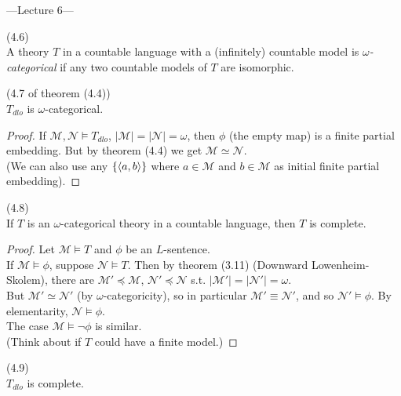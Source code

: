 \documentclass[a4paper]{article}
\begin{document}
---Lecture 6---

\begin{defi} (4.6)\\
    A theory $T$ in a countable language with a (infinitely) countable model is \emph{$\omega$-categorical} if any two countable models of $T$ are isomorphic.
\end{defi}

\begin{coro} (4.7 of theorem (4.4))\\
    $T_{dlo}$ is $\omega$-categorical.
    \begin{proof}
        If $\mathcal{M}, \mathcal{N} \vDash T_{dlo}$, $|\mathcal{M}| = |\mathcal{N}| = \omega$, then $\phi$ (the empty map) is a finite partial embedding. But by theorem (4.4) we get $\mathcal{M} \simeq \mathcal{N}$.\\
        (We can also use any $\{\langle a,b\rangle\}$ where $a \in \mathcal{M}$ and $b \in \mathcal{M}$ as initial finite partial embedding).
    \end{proof}
\end{coro}

\begin{thm} (4.8)\\
    If $T$ is an $\omega$-categorical theory in a countable language, then $T$ is complete.
    \begin{proof}
        Let $\mathcal{M} \vDash T$ and $\phi$ be an $L$-sentence.\\
        If $\mathcal{M} \vDash \phi$, suppose $\mathcal{N} \vDash T$. Then by theorem (3.11) (Downward Lowenheim-Skolem), there are $\mathcal{M}' \preccurlyeq \mathcal{M}$, $\mathcal{N}' \preccurlyeq\mathcal{N}$ s.t. $|\mathcal{M}'| = |\mathcal{N}'| = \omega$.\\
        But $\mathcal{M}' \simeq \mathcal{N}'$ (by $\omega$-categoricity), so in particular $\mathcal{M}' \equiv \mathcal{N}'$, and so $\mathcal{N}' \vDash \phi$. By elementarity, $\mathcal{N} \vDash \phi$.\\
        The case $\mathcal{M} \vDash \neg\phi$ is similar.\\
        (Think about if $T$ could have a finite model.)
    \end{proof}
\end{thm}

\begin{coro} (4.9)\\
    $T_{dlo}$ is complete.
\end{coro}
\end{document}
